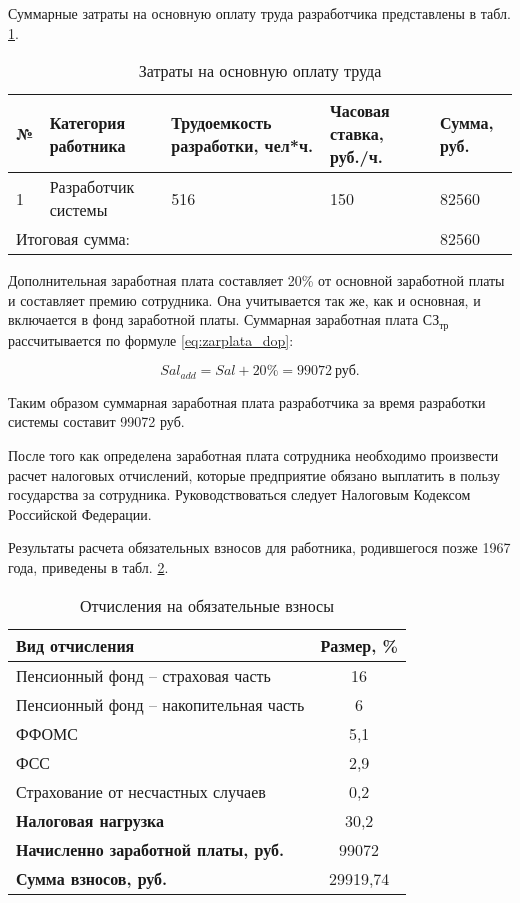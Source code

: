 Суммарные затраты на основную оплату труда разработчика представлены в табл. \ref{tab:zarplata}.

\begin{footnotesize}
\begin{longtable}[h]{|p{}|p{}|p{}|p{}|p{}|}
	\caption{\label{tab:zarplata}Затраты на основную оплату труда} \\
	\hline
		\textbf{№} &
		\textbf{Категория работника} &
		\textbf{Трудоемкость разработки, чел*ч.} &
		\textbf{Часовая ставка, руб./ч.} &
		\textbf{Сумма, руб.} \\
	\hline
		1 & Разработчик системы & 516 & 150 & 82560 \\ \hline
		\multicolumn{4}{|l|}{Итоговая сумма:} & 82560 \\ \hline
\end{longtable}
\end{footnotesize}

Дополнительная заработная плата составляет 20\% от основной заработной платы и составляет премию сотрудника.
Она учитывается так же, как и основная, и включается в фонд заработной платы.
Суммарная заработная плата $СЗ_{тр}$ рассчитывается по формуле \ref{eq:zarplata_dop}: 

\begin{equation}
	\label{eq:zarplata_dop}
	Sal_{add} = Sal + 20\% = 99072~\text{руб}.
\end{equation}

Таким образом суммарная заработная плата разработчика за время разработки системы составит 99072 руб. 

После того как определена заработная плата сотрудника необходимо произвести расчет налоговых отчислений, которые предприятие обязано выплатить в пользу государства за сотрудника.
Руководствоваться следует Налоговым Кодексом Российской Федерации.

Результаты расчета обязательных взносов для работника, родившегося позже 1967 года, приведены в табл. \ref{tab:zarplata_nalog}.

\begin{table}[h!]
\caption{\label{tab:zarplata_nalog}Отчисления на обязательные взносы}
\begin{footnotesize}
\begin{tabular}{|l|c|}
	\hline
	\textbf{Вид отчисления} & \textbf{Размер, \%} \\
	\hline 
	Пенсионный фонд -- страховая часть & 16 \\ 
	Пенсионный фонд -- накопительная часть & 6 \\
	ФФОМС & 5,1 \\ 
	ФСС & 2,9 \\ 
	Страхование от несчастных случаев & 0,2 \\
	\hline
	\textbf{Налоговая нагрузка} & 30,2 \\ \hline
	\textbf{Начисленно заработной платы, руб.} & 99072 \\ \hline
	\textbf{Сумма взносов, руб.} & 29919,74 \\ \hline
\end{tabular}
\end{footnotesize}
\end{table}

